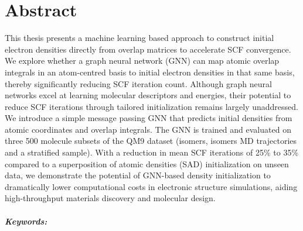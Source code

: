 \chapter*{Abstract}

This thesis presents a machine learning based approach to construct initial electron densities directly from overlap matrices to accelerate SCF convergence. We explore whether a graph neural network (GNN) can map atomic overlap integrals in an atom-centred basis to initial electron densities in that same basis, thereby significantly reducing SCF iteration count. Although graph neural networks excel at learning molecular descriptors and energies, their potential to reduce SCF iterations through tailored initialization remains largely unaddressed. We introduce a simple message passing GNN that predicts initial densities from atomic coordinates and overlap integrals. The GNN is trained and evaluated on three 500 molecule subsets of the QM9 dataset (isomers, isomers MD trajectories and a stratified sample). With a reduction in mean SCF iterations of 25\% to 35\% compared to a superposition of atomic densities (SAD) initialization on unseen data, we demonstrate the potential of GNN-based density initialization to dramatically lower computational costs in electronic structure simulations, aiding high-throughput materials discovery and molecular design.


\paragraph{Keywords:}
\mykeywordsabstract\\